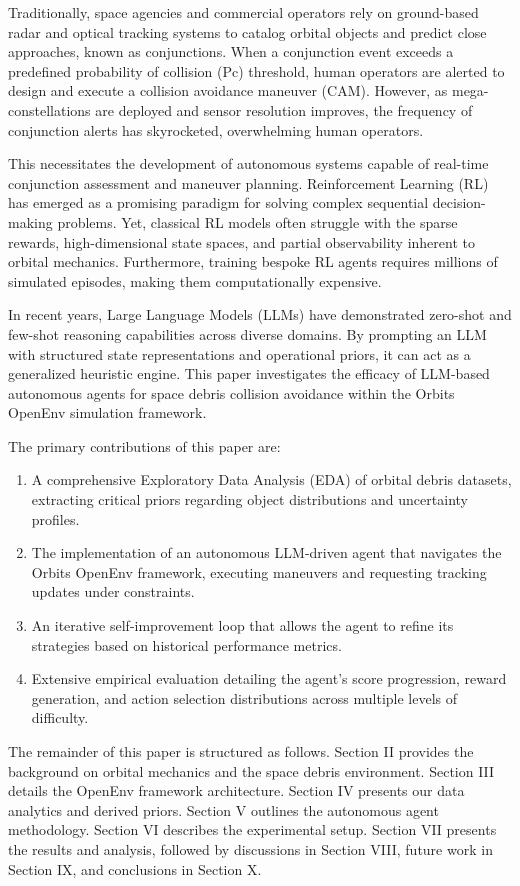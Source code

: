 \documentclass[10pt,journal,compsoc]{IEEEtran}
\begin{document}
Traditionally, space agencies and commercial operators rely on ground-based radar and optical tracking systems to catalog orbital objects and predict close approaches, known as conjunctions. When a conjunction event exceeds a predefined probability of collision (Pc) threshold, human operators are alerted to design and execute a collision avoidance maneuver (CAM). However, as mega-constellations are deployed and sensor resolution improves, the frequency of conjunction alerts has skyrocketed, overwhelming human operators.

This necessitates the development of autonomous systems capable of real-time conjunction assessment and maneuver planning. Reinforcement Learning (RL) has emerged as a promising paradigm for solving complex sequential decision-making problems. Yet, classical RL models often struggle with the sparse rewards, high-dimensional state spaces, and partial observability inherent to orbital mechanics. Furthermore, training bespoke RL agents requires millions of simulated episodes, making them computationally expensive.

In recent years, Large Language Models (LLMs) have demonstrated zero-shot and few-shot reasoning capabilities across diverse domains. By prompting an LLM with structured state representations and operational priors, it can act as a generalized heuristic engine. This paper investigates the efficacy of LLM-based autonomous agents for space debris collision avoidance within the Orbits OpenEnv simulation framework.

The primary contributions of this paper are:
\begin{enumerate}
    \item A comprehensive Exploratory Data Analysis (EDA) of orbital debris datasets, extracting critical priors regarding object distributions and uncertainty profiles.
    \item The implementation of an autonomous LLM-driven agent that navigates the Orbits OpenEnv framework, executing maneuvers and requesting tracking updates under constraints.
    \item An iterative self-improvement loop that allows the agent to refine its strategies based on historical performance metrics.
    \item Extensive empirical evaluation detailing the agent's score progression, reward generation, and action selection distributions across multiple levels of difficulty.
\end{enumerate}

The remainder of this paper is structured as follows. Section II provides the background on orbital mechanics and the space debris environment. Section III details the OpenEnv framework architecture. Section IV presents our data analytics and derived priors. Section V outlines the autonomous agent methodology. Section VI describes the experimental setup. Section VII presents the results and analysis, followed by discussions in Section VIII, future work in Section IX, and conclusions in Section X.
\end{document}
